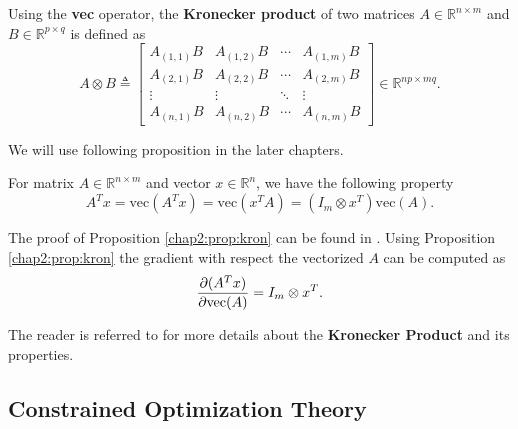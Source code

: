 \begin{definition}
  Using the \textbf{vec} operator, the \textbf{Kronecker product} of two matrices $A\in\mathbb R^{n\times m}$ and $B\in\mathbb R^{p\times q}$ is defined as
  \begin{equation}
      A\otimes B\triangleq 
      \begin{bmatrix}
        A_{(1,1)}B & A_{(1,2)}B & \cdots & A_{(1,m)}B \\
        A_{(2,1)}B & A_{(2,2)}B & \cdots & A_{(2,m)}B \\
        \vdots & \vdots & \ddots & \vdots \\
        A_{(n,1)}B & A_{(n,2)}B & \cdots & A_{(n,m)}B
      \end{bmatrix}
      \in\mathbb R^{np\times mq}
      .
  \end{equation}
\end{definition}

We will use following proposition in the later chapters.
\begin{proposition}
  For matrix $A\in\mathbb R^{n\times m}$ and vector $x\in\mathbb R^n$, we have the following property
  \begin{equation}
    A^Tx = \text{vec}(A^Tx) = \text{vec}(x^TA) = (I_m\otimes x^T)\text{vec}(A)
    .
  \end{equation}
  \label{chap2:prop:kron}
\end{proposition}
The proof of Proposition \ref{chap2:prop:kron} can be found in \cite{RN22}.
Using Proposition \ref{chap2:prop:kron} the gradient with respect the vectorized $A$ can be computed as
\begin{equation}
  {\partial (A^Tx)\over\partial \text{vec}(A)} = I_m\otimes x^T
  .
\end{equation}

The reader is referred to \cite[Chapter 7]{RN22} for more details about the \textbf{Kronecker Product} and its properties.

\subsection{Constrained Optimization Theory} 

